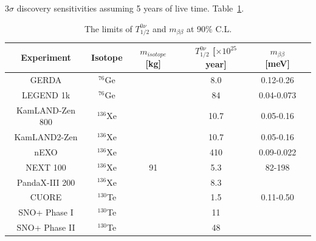 3$\sigma$ discovery sensitivities assuming 5 years of live time.
 Table~\ref{gerdatable}\cite{agostini2017discovery,agostini2019probing}.
\begin{table}[ht]
	\caption{\label{gerdatable} The limits of $T^{0\nu}_{1/2}$ and $m_{\beta\beta}$ at 90\% C.L.}	
	{\centering
		\begin{tabular*}{135mm}{c@{\extracolsep{\fill}}ccccc}
			\toprule 
			Experiment & Isotope & $m_{isotope}$ [kg] & $T^{0\nu}_{1/2}$ [$\times 10^{25}$ year] & $m_{\beta\beta}$ [meV]\\
			\midrule
			GERDA       & $^{76}$Ge & & 8.0 & 0.12-0.26  \\	
			LEGEND 1k & $^{76}$Ge & & 84 & 0.04-0.073\\
		    KamLAND-Zen 800& $^{136}$Xe & & 10.7 & 0.05-0.16	\\
			KamLAND2-Zen & $^{136}$Xe & & 10.7 & 0.05-0.16	\\
			nEXO         & $^{136}$Xe & & 410 & 0.09-0.022  \\
			NEXT 100& $^{136}$Xe& 91 &  5.3 & 82-198\\
			PandaX-III 200& $^{136}$Xe & & 8.3 &\\	
			CUORE       & $^{130}$Te&  & 1.5 &  0.11-0.50 \\
			SNO+ Phase I &$^{130}$Te&  &11\\
			SNO+ Phase II &$^{130}$Te&  &48\\
			\bottomrule	
		\end{tabular*}
	}
\end{table}
\vspace{1cm}




